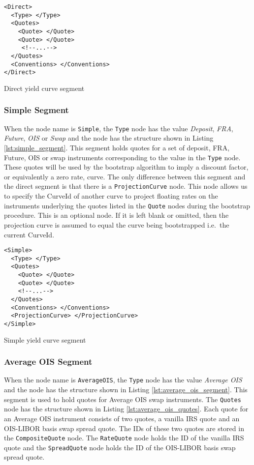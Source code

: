 \begin{listing}[H]
\begin{verbatim}
<Direct>
  <Type> </Type>
  <Quotes>
    <Quote> </Quote>
    <Quote> </Quote>
     <!--...-->
  </Quotes>
  <Conventions> </Conventions>
</Direct>
\end{verbatim}
\caption{Direct yield curve segment}
\label{lst:direct_segment]}
\end{listing}


\subsubsection*{Simple Segment}
When the node name is \lstinline!Simple!, the \lstinline!Type! node has the value \emph{Deposit}, \emph{FRA}, 
\emph{Future}, \emph{OIS} or \emph{Swap} and the node has the structure shown in Listing \ref{lst:simple_segment}. This 
segment holds quotes for a set of deposit, FRA, Future, OIS or swap instruments corresponding to the value in the 
\lstinline!Type! node. These quotes will be used by the bootstrap algorithm to imply a discount factor, or equivalently a 
zero rate, curve. The only difference between this segment and the direct segment is that there is a 
\lstinline!ProjectionCurve! node. This node allows us to specify the CurveId of another curve to project floating rates on 
the instruments underlying the quotes listed in the \lstinline!Quote! nodes during the bootstrap procedure. This is an 
optional node. If it is left blank or omitted, then the projection curve is assumed to equal the curve being bootstrapped 
i.e.\ the current CurveId.

\begin{listing}[H]
\begin{verbatim}
<Simple>
  <Type> </Type>
  <Quotes>
    <Quote> </Quote>
    <Quote> </Quote>
    <!--...-->
  </Quotes>
  <Conventions> </Conventions>
  <ProjectionCurve> </ProjectionCurve>
</Simple>
\end{verbatim}
\caption{Simple yield curve segment}
\label{lst:simple_segment]}
\end{listing}

\subsubsection*{Average OIS Segment}
When the node name is \lstinline!AverageOIS!, the \lstinline!Type! node has the value \emph{Average OIS} and the node has 
the structure shown in Listing \ref{lst:average_ois_segment}. This segment is used to hold quotes for Average OIS swap 
instruments. The \lstinline!Quotes! node has the structure shown in Listing \ref{lst:average_ois_quotes}. Each quote for 
an Average OIS instrument consists of two quotes, a vanilla IRS quote and an OIS-LIBOR basis swap spread quote. The IDs of 
these two quotes are stored in the \lstinline!CompositeQuote! node. The \lstinline!RateQuote! node holds the ID of the  
vanilla IRS quote and the \lstinline!SpreadQuote! node holds the ID of the OIS-LIBOR basis swap spread quote.


